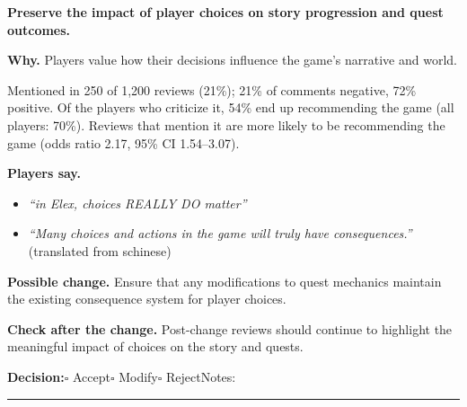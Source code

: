 \documentclass[10pt]{article}
\begin{document}
\begin{tcolorbox}[colback=white,colframe=gP,colbacktitle=lP,coltitle=black,title={\textbf{P1}\quad Story Engagement\hfill\textcolor{gP}{\textbf{Protect}}},boxrule=0.8pt,arc=2pt,left=6pt,right=6pt,top=4pt,bottom=4pt,before skip=8pt,after skip=8pt]
{\large\textbf{Preserve the impact of player choices on story progression and quest outcomes.}}

\smallskip
\textbf{Why.} Players value how their decisions influence the game's narrative and world.

\smallskip
{\small Mentioned in 250 of 1,200 reviews (21\%); 21\% of comments negative, 72\% positive. Of the players who criticize it, 54\% end up recommending the game (all players: 70\%). Reviews that mention it are more likely to be recommending the game {\color{ink2}\footnotesize(odds ratio 2.17, 95\% CI 1.54--3.07)}.}

\smallskip
\textbf{Players say.}
\begin{itemize}[leftmargin=12pt,itemsep=1pt,topsep=2pt]
    \item \textit{``in Elex, choices REALLY DO matter''}
    \item \textit{``Many choices and actions in the game will truly have consequences.''} {\footnotesize(translated from schinese)}
\end{itemize}
\textbf{Possible change.} Ensure that any modifications to quest mechanics maintain the existing consequence system for player choices.

\smallskip
\textbf{Check after the change.} Post-change reviews should continue to highlight the meaningful impact of choices on the story and quests.

\medskip
{\small\textbf{Decision:}\quad $\square$ Accept\quad $\square$ Modify\quad $\square$ Reject\qquad Notes: \rule{0.38\linewidth}{0.4pt}}
\end{tcolorbox}
\end{document}
